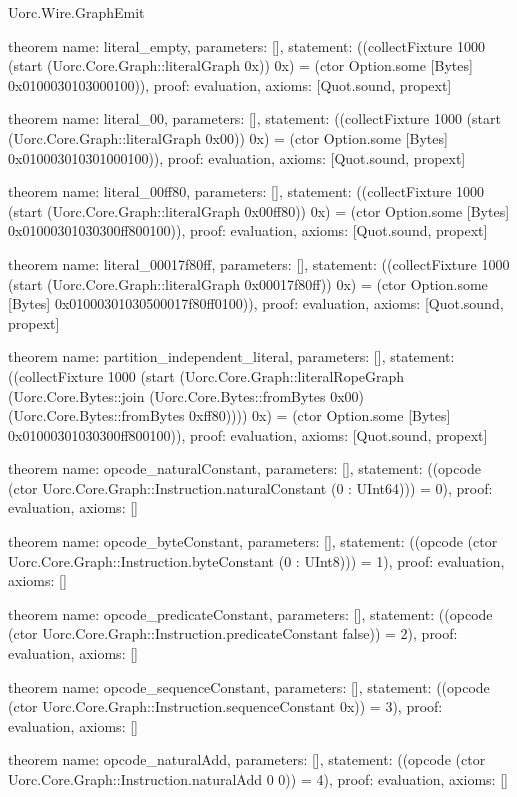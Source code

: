 \begin{lexlean}{Uorc.Wire.GraphEmit}
\begin{semanticmodule}
theorem{
  name: literal_empty,
  parameters: [],
  statement: ((collectFixture 1000 (start (Uorc.Core.Graph::literalGraph 0x)) 0x) = (ctor Option.some [Bytes] 0x0100030103000100)),
  proof: evaluation{},
  axioms: [Quot.sound, propext]
}

theorem{
  name: literal_00,
  parameters: [],
  statement: ((collectFixture 1000 (start (Uorc.Core.Graph::literalGraph 0x00)) 0x) = (ctor Option.some [Bytes] 0x010003010301000100)),
  proof: evaluation{},
  axioms: [Quot.sound, propext]
}

theorem{
  name: literal_00ff80,
  parameters: [],
  statement: ((collectFixture 1000 (start (Uorc.Core.Graph::literalGraph 0x00ff80)) 0x) = (ctor Option.some [Bytes] 0x01000301030300ff800100)),
  proof: evaluation{},
  axioms: [Quot.sound, propext]
}

theorem{
  name: literal_00017f80ff,
  parameters: [],
  statement: ((collectFixture 1000 (start (Uorc.Core.Graph::literalGraph 0x00017f80ff)) 0x) = (ctor Option.some [Bytes] 0x01000301030500017f80ff0100)),
  proof: evaluation{},
  axioms: [Quot.sound, propext]
}

theorem{
  name: partition_independent_literal,
  parameters: [],
  statement: ((collectFixture 1000 (start (Uorc.Core.Graph::literalRopeGraph (Uorc.Core.Bytes::join (Uorc.Core.Bytes::fromBytes 0x00) (Uorc.Core.Bytes::fromBytes 0xff80)))) 0x) = (ctor Option.some [Bytes] 0x01000301030300ff800100)),
  proof: evaluation{},
  axioms: [Quot.sound, propext]
}

theorem{
  name: opcode_naturalConstant,
  parameters: [],
  statement: ((opcode (ctor Uorc.Core.Graph::Instruction.naturalConstant (0 : UInt64))) = 0),
  proof: evaluation{},
  axioms: []
}

theorem{
  name: opcode_byteConstant,
  parameters: [],
  statement: ((opcode (ctor Uorc.Core.Graph::Instruction.byteConstant (0 : UInt8))) = 1),
  proof: evaluation{},
  axioms: []
}

theorem{
  name: opcode_predicateConstant,
  parameters: [],
  statement: ((opcode (ctor Uorc.Core.Graph::Instruction.predicateConstant false)) = 2),
  proof: evaluation{},
  axioms: []
}

theorem{
  name: opcode_sequenceConstant,
  parameters: [],
  statement: ((opcode (ctor Uorc.Core.Graph::Instruction.sequenceConstant 0x)) = 3),
  proof: evaluation{},
  axioms: []
}

theorem{
  name: opcode_naturalAdd,
  parameters: [],
  statement: ((opcode (ctor Uorc.Core.Graph::Instruction.naturalAdd 0 0)) = 4),
  proof: evaluation{},
  axioms: []
}


\end{semanticmodule}
\end{lexlean}
